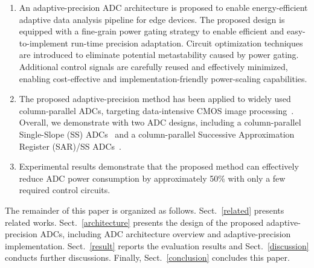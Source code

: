 \begin{enumerate}[\IEEEsetlabelwidth{3)}]
\item 
An adaptive-precision ADC architecture is proposed to enable energy-efficient adaptive data analysis pipeline for edge devices. 
The proposed design is equipped with a fine-grain power gating strategy to enable efficient and easy-to-implement run-time precision adaptation.
Circuit optimization techniques are introduced to eliminate potential metastability caused by power gating. 
Additional control signals are carefully reused and effectively minimized, enabling cost-effective and implementation-friendly power-scaling 
capabilities.  
\item 
The proposed adaptive-precision method has been applied to widely used column-parallel ADCs, targeting data-intensive CMOS image 
processing~\cite{kim_11-bit_2021,nie_single_2020,kumagai_14-inch_2018,park_640_2020}. Overall, we demonstrate with two ADC designs, including 
a column-parallel Single-Slope (SS) ADCs~\cite{snoeij_18v_2005,kleinfelder_10000_2001} and a column-parallel Successive Approximation Register (SAR)/SS ADCs~\cite{kim_area-efficient_2016}. 


	\item 
	Experimental results demonstrate that the proposed method can effectively reduce ADC power consumption by approximately 50\% with only a few required control circuits.

\end{enumerate} 

The remainder of this paper is organized as follows. 
Sect.~\ref{related} presents related works.
Sect.~\ref{architecture} presents the design of the proposed adaptive-precision ADCs, including ADC architecture overview and adaptive-precision implementation. 
Sect.~\ref{result} reports the evaluation results and Sect.~\ref{discussion} conducts further discussions. 
Finally, Sect.~\ref{conclusion} concludes this paper.
